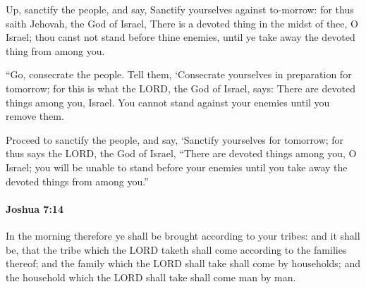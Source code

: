 			\begin{versebox}
					\item[BHS] 
					\item[ASV] Up, sanctify the people, and say, Sanctify yourselves against to-morrow: for thus saith Jehovah, the God of Israel, There is a devoted thing in the midst of thee, O Israel; thou canst not stand before thine enemies, until ye take away the devoted thing from among you.
					\item[NIV] “Go, consecrate the people. Tell them, ‘Consecrate yourselves in preparation for tomorrow; for this is what the LORD, the God of Israel, says: There are devoted things among you, Israel. You cannot stand against your enemies until you remove them.
					\item[NRSV] Proceed to sanctify the people, and say, ‘Sanctify yourselves for tomorrow; for thus says the LORD, the God of Israel, “There are devoted things among you, O Israel; you will be unable to stand before your enemies until you take away the devoted things from among you.”
			\end{versebox}

		\paragraph{Joshua 7:14} %
			\label{JOSHUA-7-14}

			In the morning therefore ye shall be brought according to your tribes: and it shall be, that the tribe which the LORD taketh shall come according to the families thereof; and the family which the LORD shall take shall come by households; and the household which the LORD shall take shall come man by man.

